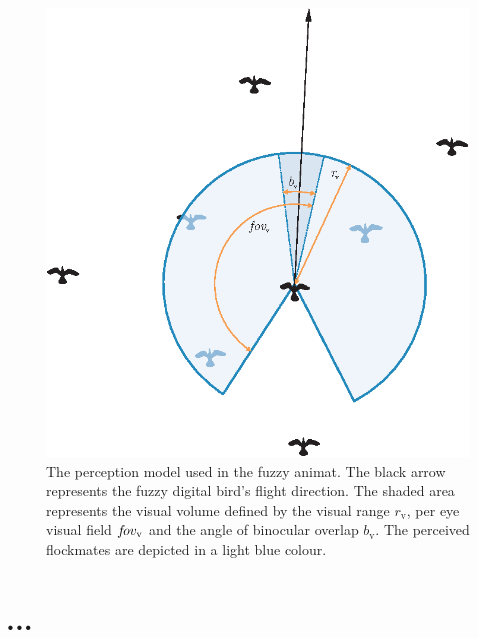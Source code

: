 \begin{figure}
 \includegraphics{fig[perception]}
 \caption{The perception model used in the fuzzy animat. The black arrow represents the fuzzy digital bird's flight direction. The shaded area represents the visual volume defined by the visual range $r_\mathrm{v}$, per eye visual field $f\kern-1.5ptov_\mathrm{v}$ and the angle of binocular overlap $b_\mathrm{v}$. The perceived flockmates are depicted in a light blue colour.}
 \label{fig:x}
\end{figure}


\section{...}
